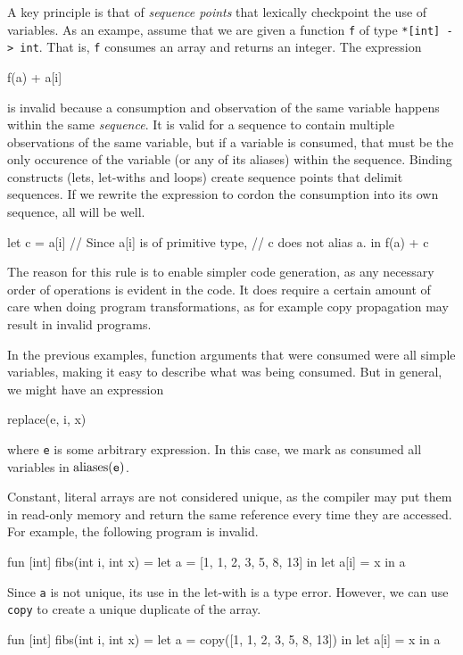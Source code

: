 
A key principle is that of \textit{sequence points} that lexically
checkpoint the use of variables.  As an exampe, assume that we are
given a function \texttt{f} of type \texttt{*[int] -> int}.  That is,
\texttt{f} consumes an array and returns an integer.  The expression
\begin{colorcode}
  f(a) + a[i]
\end{colorcode}
is invalid because a consumption and observation of the same variable
happens within the same \textit{sequence}.  It is valid for a sequence
to contain multiple observations of the same variable, but if a
variable is consumed, that must be the only occurence of the variable
(or any of its aliases) within the sequence.  Binding constructs
(lets, let-withs and loops) create sequence points that delimit
sequences.  If we rewrite the expression to cordon the consumption
into its own sequence, all will be well.
\begin{colorcode}
  let c = a[i] // Since a[i] is of primitive type,
               // c does not alias a.
  in f(a) + c
\end{colorcode}

The reason for this rule is to enable simpler code generation, as any
necessary order of operations is evident in the code.  It does require
a certain amount of care when doing program transformations, as for
example copy propagation may result in invalid programs.

In the previous examples, function arguments that were consumed were
all simple variables, making it easy to describe what was being
consumed.  But in general, we might have an expression
\begin{colorcode}
  replace(e, i, x)
\end{colorcode}
where \texttt{e} is some arbitrary expression.  In this case, we mark
as consumed all variables in $\textrm{aliases}(\texttt{e})$.

Constant, literal arrays are not considered unique, as the compiler
may put them in read-only memory and return the same reference every
time they are accessed.  For example, the following program is
invalid.
\begin{colorcode}
  fun [int] fibs(int i, int x) =
    let a = [1, 1, 2, 3, 5, 8, 13] in
    let a[i] = x in a
\end{colorcode}
Since \texttt{a} is not unique, its use in the let-with is a type
error.  However, we can use \texttt{copy} to create a unique duplicate
of the array.
\begin{colorcode}
  fun [int] fibs(int i, int x) =
    let a = copy([1, 1, 2, 3, 5, 8, 13]) in
    let a[i] = x in a
\end{colorcode}

